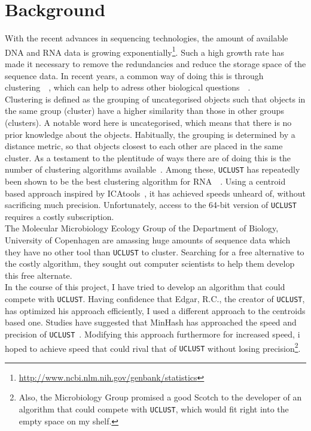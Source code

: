 \documentclass[../../main.tex]{subfiles}
\begin{document}
\section{Background}

With the recent advances in sequencing technologies, the amount of available DNA and RNA data is growing exponentially\footnote{\url{http://www.ncbi.nlm.nih.gov/genbank/statistics}}. Such a high growth rate has made it necessary to remove the redundancies and reduce the storage space of the sequence data. In recent years, a common way of doing this is through clustering~\cite{clusteringIntro}~\cite{russell}, which can help to adress other biological questions~\cite{modelClust}~\cite{Edgar1}.\\

Clustering is defined as the grouping of uncategorised objects such that objects in the same group (cluster) have a higher similarity than those in other groups (clusters). A notable word here is uncategorised, which means that there is no prior knowledge about the objects. Habitually, the grouping is determined by a distance metric, so that objects closest to each other are placed in the same cluster. As a testament to the plentitude of ways there are of doing this is the number of clustering algorithms available~\cite{Comparison16S}. Among these, {\tt UCLUST} has repeatedly been shown to be the best clustering algorithm for RNA~\cite{Edgar1}~\cite{Comparison16S}. Using a centroid based approach inspired by ICAtools~\cite{icatools}, it has achieved speeds unheard of, without sacrificing much precision. Unfortunately, access to the 64-bit version of {\tt UCLUST} requires a costly subscription.\\

The Molecular Microbiology Ecology Group of the Department of Biology, University of Copenhagen are amassing huge amounts of sequence data which they have no other tool than {\tt UCLUST} to cluster. Searching for a free alternative to the costly algorithm, they sought out computer scientists to help them develop this free alternate.\\

In the course of this project, I have tried to develop an algorithm that could compete with {\tt UCLUST}. Having confidence that Edgar, R.C., the creator of {\tt UCLUST}, has optimized his approach efficiently, I used a different approach to the centroids based one. Studies have suggested that MinHash has approached the speed and precision of {\tt UCLUST}~\cite{MinhashMapreduce}. Modifying this approach furthermore for increased speed, i hoped to achieve speed that could rival that of {\tt UCLUST} without losing precision\footnote{Also, the Microbiology Group promised a good Scotch to the developer of an algorithm that could compete with {\tt UCLUST}, which would fit right into the empty space on my shelf.}.\\
\end{document}
